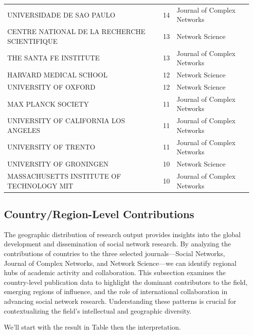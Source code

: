 \documentclass[twocolumn]{article}
\begin{document}
\begin{table}
{\begin{tabular}{lcl}
				UNIVERSIDADE DE SAO PAULO                     & 14 & Journal of Complex Networks \\
				CENTRE NATIONAL DE LA RECHERCHE SCIENTIFIQUE  & 13 & Network Science \\
				THE SANTA FE INSTITUTE                        & 13 & Journal of Complex Networks \\
				HARVARD MEDICAL SCHOOL                        & 12 & Network Science \\
				UNIVERSITY OF OXFORD                          & 12 & Network Science \\
				MAX PLANCK SOCIETY                            & 11 & Journal of Complex Networks \\
				UNIVERSITY OF CALIFORNIA LOS ANGELES          & 11 & Journal of Complex Networks \\
				UNIVERSITY OF TRENTO                          & 11 & Journal of Complex Networks \\
				UNIVERSITY OF GRONINGEN                       & 10 & Network Science \\
				MASSACHUSETTS INSTITUTE OF TECHNOLOGY MIT     & 10 & Journal of Complex Networks \\
				\bottomrule
		\end{tabular}}
	\end{table}

	
	
	\subsection{Country/Region-Level Contributions}
	
	The geographic distribution of research output provides insights into the global development and dissemination of social network research. By analyzing the contributions of countries to the three selected journals—Social Networks, Journal of Complex Networks, and Network Science—we can identify regional hubs of academic activity and collaboration. This subsection examines the country-level publication data to highlight the dominant contributors to the field, emerging regions of influence, and the role of international collaboration in advancing social network research. Understanding these patterns is crucial for contextualizing the field's intellectual and geographic diversity.
	
	We'll start with the result in Table then the interpretation.
	
	
	
	
\end{document}
